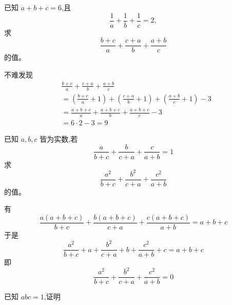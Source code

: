 \begin{questions}
    \question 已知 $a+b+c=6$,且
    \[
    \frac{1}{a}+\frac{1}{b}+\frac{1}{c}=2,
    \]
    求
    \[
    \frac{b+c}{a}+\frac{c+a}{b}+\frac{a+b}{c}
    \]
    的值。
    \begin{solution}
        不难发现
        \begin{align*}
        &\frac{b+c}{a}+\frac{c+a}{b}+\frac{a+b}{c} \\
        &=\left(\frac{b+c}{a}+1\right)+\left(\frac{c+a}{b}+1\right)+\left(\frac{a+b}{c}+1\right)-3 \\
        &=\frac{a+b+c}{a}+\frac{a+b+c}{b}+\frac{a+b+c}{c}-3 \\
        &=6\cdot2-3=9
        \end{align*}
    \end{solution}

    \question 已知 $a,b,c$ 皆为实数,若
    \[
    \frac{a}{b+c}+\frac{b}{c+a}+\frac{c}{a+b}=1
    \]
    求
    \[
    \frac{a^{2}}{b+c}+\frac{b^{2}}{c+a}+\frac{c^{2}}{a+b}
    \]
    的值。
    \begin{solution}
        有
        \[
        \frac{a(a+b+c)}{b+c}+\frac{b(a+b+c)}{c+a} +\frac{c(a+b+c)}{a+b}=a+b+c
        \]
        于是
        \[
        \frac{a^2}{b+c}+ a+\frac{b^2}{c+a}+ b+\frac{c^2}{a+b}+c=a+b+c
        \]
        即
        \[
        \frac{a^2}{b+c}+ \frac{b^2}{c+a}+\frac{c^2}{a+b}=0
        \]
    \end{solution}

    \question 已知 $abc=1$,证明
\end{questions}
